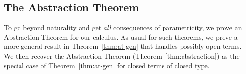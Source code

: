 \documentclass[runningheads]{llncs}
\newcommand{\set}{\mathsf{Set}}
\newcommand{\map}{\mathsf{map}}
\begin{document}
\begin{comment}
So, we can conclude that
\begin{equation}
\map_{\setsem{\Gamma; \ol\alpha \vdash G} \rho[\ol{\alpha := \_}]} \ol{y}
  \circ 
  x_{\ol{{\setsem{\Gamma; \emptyset \vdash \sigma} \rho}}}
= x_{\ol{\setsem{\Gamma; \emptyset \vdash \tau} \rho} }
\circ \map_{\setsem{\Gamma; \ol\alpha \vdash F} 
  \rho[\ol{\alpha := \_}]} \, \ol{y}
\end{equation}

Moreover, for any $\ol{A, B: \set}$,
we can choose $\ol{\sigma = v}$ and $\ol{\tau = w}$ to be variables such that
$\ol{\rho v = A}$ and $\ol{\rho w = B}$.
Then for any functions $\ol{f : A \to B}$ we have that
\begin{equation}
\map_{\setsem{\Gamma; \ol\alpha \vdash G} \rho[\ol{\alpha := \_}]} \ol{f}
  \circ 
  x_{\ol{A}}
  = x_{\ol{B}}
\circ \map_{\setsem{\Gamma; \ol\alpha \vdash F} 
  \rho[\ol{\alpha := \_}]} \, \ol{f}
\end{equation}
\end{proof}
\end{comment}

\subsection{The Abstraction Theorem}\label{sec:thms} 

To go beyond naturality and get {\em all} consequences of
parametricity, we prove an Abstraction Theorem for our calculus. As
usual for such theorems, we prove a more general result in
Theorem~\ref{thm:at-gen} that handles possibly open terms. We then
recover the Abstraction Theorem (Theorem~\ref{thm:abstraction}) as the
special case of Theorem~\ref{thm:at-gen} for closed terms of closed type.
\end{document}
